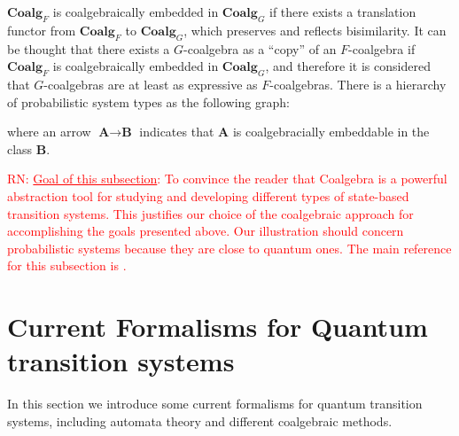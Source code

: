 \documentclass[a4paper, 11pt]{article}
\newcommand{\nevComment}[1]{\textcolor{red}{RN: #1}}
\begin{document}
$\textbf{Coalg}_F$ is coalgebraically embedded in $\textbf{Coalg}_G$ if there exists a translation functor from $\textbf{Coalg}_F$ to $\textbf{Coalg}_G$, which preserves and reflects bisimilarity. It can be thought that there exists a $G$-coalgebra as a ``copy'' of an $F$-coalgebra if $\textbf{Coalg}_F$ is coalgebraically embedded in $\textbf{Coalg}_G$, and therefore it is considered that $G$-coalgebras are at least as expressive as $F$-coalgebras. There is a hierarchy of probabilistic system types as the following graph:
\begin{center}
\end{center}
where an arrow $\textbf{A}\rightarrow \textbf{B}$ indicates that $\textbf{A}$ is coalgebracially embeddable in the class $\textbf{B}$.

\nevComment{\underline{Goal of this subsection}: To convince the
  reader that Coalgebra is a powerful abstraction tool for studying
  and developing different types of state-based transition systems.
  This justifies our choice of the coalgebraic approach for
  accomplishing the goals presented above. Our illustration should concern
  probabilistic systems because they are close to quantum ones. The
  main reference for this subsection is \cite{sokolova}.}


\section{Current Formalisms for Quantum transition systems}
In this section we introduce some current formalisms for quantum transition systems, including automata theory and different coalgebraic methods. 
\end{document}
